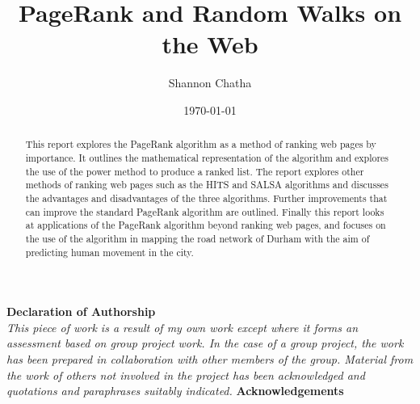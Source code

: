 \documentclass[11pt]{report}
\title{\textbf{PageRank and Random Walks on the Web}}
\author{Shannon Chatha}
\date{\today}
\begin{document}
\maketitle
\begin{abstract}
This report explores the PageRank algorithm as a method of ranking web pages by importance. It outlines the mathematical representation of the algorithm and explores the use of the power method to produce a ranked list. The report explores other methods of ranking web pages such as the HITS and SALSA algorithms and discusses the advantages and disadvantages of the three algorithms. Further improvements that can improve the standard PageRank algorithm are outlined. Finally this report looks at applications of the PageRank algorithm beyond ranking web pages, and focuses on the use of the algorithm in mapping the road network of Durham with the aim of predicting human movement in the city.
\end{abstract}
\newpage
\vspace*{\fill}
\begin{center}
\textbf{Declaration of Authorship}\\ 
\textit{This piece of work is a result of my own work except where it forms an assessment
based on group project work. In the case of a group project, the work
has been prepared in collaboration with other members of the group. Material
from the work of others not involved in the project has been acknowledged and
quotations and paraphrases suitably indicated.}
\bigbreak
\bigbreak
\textbf{Acknowledgements}

\end{center}
\vspace*{\fill}

\mbox{}
 

\end{document}
